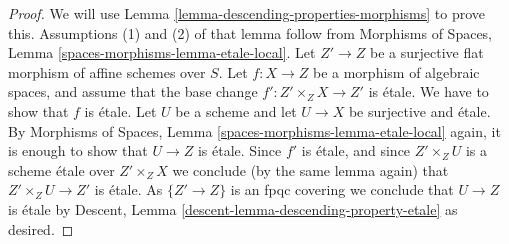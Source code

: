 \documentclass[10pt,a4paper]{amsart}
\theoremstyle{plain}
\theoremstyle{definition}
\theoremstyle{remark}
\numberwithin{equation}{subsection}
\begin{document}
\begin{proof}
We will use
Lemma \ref{lemma-descending-properties-morphisms}
to prove this. Assumptions (1) and (2) of that lemma follow from
Morphisms of Spaces,
Lemma \ref{spaces-morphisms-lemma-etale-local}.
Let $Z' \to Z$ be a surjective flat morphism of affine schemes over $S$.
Let $f : X \to Z$ be a morphism of algebraic spaces, and assume
that the base change $f' : Z' \times_Z X \to Z'$ is \'etale.
We have to show that $f$ is \'etale. Let $U$ be a scheme
and let $U \to X$ be surjective and \'etale. By
Morphisms of Spaces,
Lemma \ref{spaces-morphisms-lemma-etale-local}
again, it is enough to show that $U \to Z$ is \'etale.
Since $f'$ is \'etale, and since $Z' \times_Z U$ is a
scheme \'etale over $Z' \times_Z X$ we conclude (by the same lemma again) that
$Z' \times_Z U \to Z'$ is \'etale.
As $\{Z' \to Z\}$ is an fpqc covering we conclude that
$U \to Z$ is \'etale by
Descent, Lemma \ref{descent-lemma-descending-property-etale}
as desired.
\end{proof}
\end{document}
